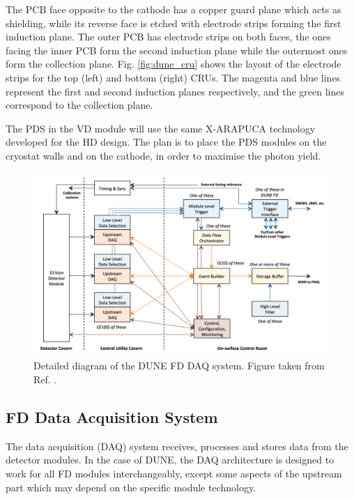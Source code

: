 The PCB face opposite to the cathode has a copper guard plane which acts as shielding, while its reverse face is etched with electrode strips forming the first induction plane. The outer PCB has electrode strips on both faces, the ones facing the inner PCB form the second induction plane while the outermost ones form the collection plane. Fig. \ref{fig:dune_cru} shows the layout of the electrode strips for the top (left) and bottom (right) CRUs. The magenta and blue lines represent the first and second induction planes respectively, and the green lines correspond to the collection plane.

The PDS in the VD module will use the same X-ARAPUCA technology developed for the HD design. The plan is to place the PDS modules on the cryostat walls and on the cathode, in order to maximise the photon yield.


\begin{figure}[t]
	\centering
	\includegraphics[width=0.8\linewidth]{Images/DUNE/FD/DAQ_detailed2}
	\caption[Detailed diagram of the DUNE FD DAQ system.]{Detailed diagram of the DUNE FD DAQ system. Figure taken from Ref. \cite{DUNE2020TDR4}.}
	\label{fig:daq1}
\end{figure}

\subsection{FD Data Acquisition System}

The data acquisition (DAQ) system receives, processes and stores data from the detector modules. In the case of DUNE, the DAQ architecture is designed to work for all FD modules interchangeably, except some aspects of the upstream part which may depend on the specific module technology.


